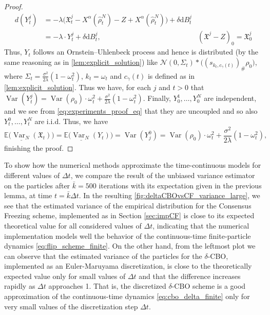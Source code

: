 \documentclass[reqno]{amsart}
\numberwithin{algorithm}{section}
\newcommand{\diff}{\mathrm{d}}
\newcommand{\EE}{{\mathbb E}}
\newcommand{\Xalpha}{{X^\alpha}}
\newcommand{\Xf}{{\mathfrak{X}}}
\newcommand{\mc}[1]{\mathcal{#1}}
\begin{document}
{\begin{proof}
\begin{equation}
    \begin{aligned}
        d(Y^j_t) &= -\lambda \big(\Xf_t^j -  \Xalpha(\widehat\rho^N_t) - Z + \Xalpha(\widehat\rho^N_t)\big) + \delta \diff B_t^j& \\
        &= -\lambda \cdot Y^j_t + \delta \diff B_t^j, &(\Xf^j - Z)_0 = \Xf^j_0
    \end{aligned}
    \end{equation}
    Thus, $Y_t$ follows an Ornstein–Uhlenbeck process and hence is distributed (by the same reasoning as in \cref{lem:explicit_solution}) like 
    $\mc{N}(0, \Sigma_t) \ast \Big((s_{k_t,c_\gamma(t)})_\# \rho_0\Big)$, where $\Sigma_t = \frac{\sigma^2}{2\lambda} (1-\omega_t^2)$, $k_t =\omega_t$ and $c_{\gamma}(t)$ is defined as in \cref{lem:explicit_solution}. Thus we have, for each $j$ and $t > 0$ that $\operatorname{Var}(Y_t^j) = \operatorname{Var}(\rho_0) \cdot \omega_t^2 + \frac{\sigma^2}{2\lambda} (1 - \omega_t^2).$ Finally, $Y_0^1, \dots, Y_0^N$ are independent, and we see from \cref{eq:experiments_proof_eq} that they are uncoupled and so also $Y_t^0, \dots, Y_t^N$ are i.i.d. Thus, we have
    \begin{equation*}
        \EE\big(\underline{\operatorname{Var}_N}(\Xf_t)\big) = \EE\big(\underline{\operatorname{Var}_N}(Y_t)\big) = \operatorname{Var}(Y_j^0) = \operatorname{Var}(\rho_0) \cdot \omega_t^2 + \frac{\sigma^2}{2\lambda} (1 - \omega_t^2),
    \end{equation*}
    finishing the proof.
\end{proof}
To show how the numerical methods approximate the time-continuous models for different values of $\Delta t$,  we compare the result of the unbiased variance estimator on the particles after $\bar k=500$ iterations with its expectation given in the previous lemma, at time $t=\bar k\Delta t$.
In the resulting \cref{fig:deltaCBOvsCF_variance_large}, we see that the estimated variance of the empirical distribution for the Consensus Freezing scheme, implemented as in Section \ref{sec:impCF} is close to its expected theoretical value for all considered values of $\Delta t$, indicating that the numerical implementation models well the behavior of the continuous-time finite-particle dynamics \cref{eq:flip_scheme_finite}. On the other hand, from the leftmost plot we can observe that the estimated variance of the particles for the $\delta$-CBO, implemented as an Euler-Maruyama discretization, is close to the theoretically expected value only for small values of $\Delta t$ and that the difference increases rapidly as $\Delta t$ approaches 1. That is, the discretized $\delta$-CBO scheme is a good approximation of the continuous-time dynamics \cref{eq:cbo_delta_finite} only for very small values of the discretization step $\Delta t$.
}
\end{document}
